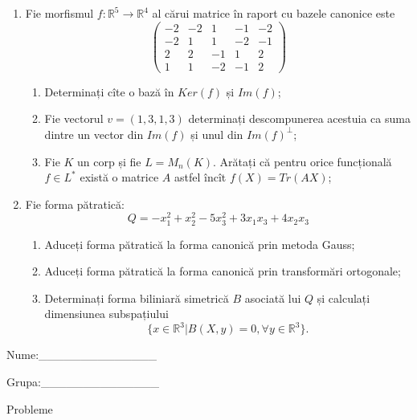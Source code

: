 \documentclass{article}
\begin{document}
\begin{enumerate}
 \item Fie morfismul $f:\mathbb{R}^5 \to \mathbb{R}^4$ al cărui matrice în raport cu bazele canonice este
$$\begin{pmatrix}
-2&-2&1&-1&-2\\
-2&1&1&-2&-1\\
2&2&-1&1&2\\
1&1&-2&-1&2
\end{pmatrix}$$

\begin{enumerate}
\item Determinați cîte o bază în $Ker(f)$ și $Im(f)$;
\item Fie vectorul $v=(1,3,1,3)$ determinați descompunerea acestuia ca suma dintre un vector din $Im(f)$ și unul din $Im(f)^\perp$;
\item Fie $K$ un corp și fie $L=M_n(K)$. Arătați că pentru orice funcțională $f \in L^*$ există o matrice $A$ astfel încît $f(X)=Tr(AX)$;
\end{enumerate}
\item Fie forma pătratică:
$$Q= -x_1^2+x_2^2-5x_3^2+3x_1x_3+4x_2x_3$$

\begin{enumerate}
\item Aduceți forma pătratică la forma canonică prin metoda Gauss;
\item Aduceți forma pătratică la forma canonică prin transformări ortogonale;
\item Determinați forma biliniară simetrică $B$ asociată lui $Q$ și calculați dimensiunea subspațiului
$$\{x \in \mathbb{R}^3 | B(X,y)=0,\forall y \in \mathbb{R}^3\}.$$

\end{enumerate}
\end{enumerate}
\newpage
\begin{flushright}
Nume:\_\_\_\_\_\_\_\_\_\_\_\_\_\_
 
 
Grupa:\_\_\_\_\_\_\_\_\_\_\_\_\_\_
\end{flushright}
\begin{center}
\vspace{2cm}
{\Large Probleme}
\vspace{2cm}
\end{center}
\end{document}
